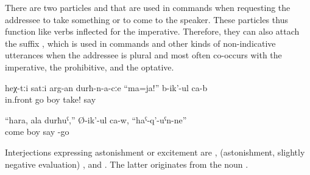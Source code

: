 There are two particles  	and   that are used in commands when requesting the addressee to take something or to come to the speaker. These particles thus function like verbs inflected for the imperative. Therefore, they can also attach the suffix  , which is used in commands and other kinds of non-indicative utterances when the addressee is plural and most often co-occurs with the imperative, the prohibitive, and the optative.

\begin{exe}
	\ex	\label{ex:‎They say to the guys passing by, Take (a drink) minor}
	\gll	heχ-tːi		satːi	arg-an	durħ-n-a-cːe	``ma=ja!''		b-ik'-ul	ca-b\\
			in.front	go	boy	take!	say	\\
	\glt	{}

	\ex	\label{ex:‎Come, you son is arriving, he says minor}
	\gll	``hara,	ala	durħuˁ,''	Ø-ik'-ul	ca-w,	``haˁ-q'-uˁn-ne''\\
		come		boy	say		-go\\
	\glt	{}
\end{exe}	

Interjections expressing astonishment or excitement are  ,   (astonishment, slightly negative evaluation) , and   . The latter originates from the noun  .

